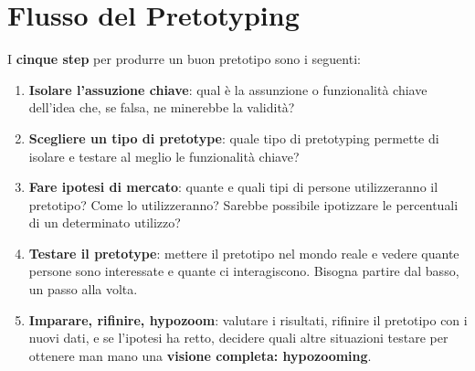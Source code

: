 \section{Flusso del Pretotyping}

I \textbf{cinque step} per produrre un buon pretotipo sono i seguenti:

\begin{enumerate}
	\item \textbf{Isolare l'assuzione chiave}: qual è la assunzione o funzionalità chiave dell'idea che, se falsa, ne minerebbe la validità?
	\item \textbf{Scegliere un tipo di pretotype}: quale tipo di pretotyping permette di isolare e testare al meglio le funzionalità chiave?
	\item \textbf{Fare ipotesi di mercato}: quante e quali tipi di persone utilizzeranno il pretotipo? Come lo utilizzeranno? Sarebbe possibile ipotizzare le percentuali di un determinato utilizzo?
	\item \textbf{Testare il pretotype}: mettere il pretotipo nel mondo reale e vedere quante persone sono interessate e quante ci interagiscono. Bisogna partire dal basso, un passo alla volta.
	\item \textbf{Imparare, rifinire, hypozoom}: valutare i risultati, rifinire il pretotipo con i nuovi dati, e se l'ipotesi ha retto, decidere quali altre situazioni testare per ottenere man mano una \textbf{visione completa: hypozooming}.
\end{enumerate}

\pagebreak

